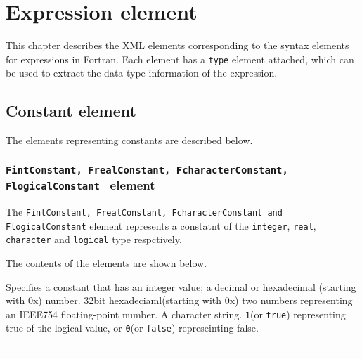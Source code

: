 \section{Expression element}

This chapter describes the XML elements corresponding to the syntax elements for expressions in Fortran.
Each element has a {\tt type} element attached, which can be used to extract the data type information of the expression.

\subsection{Constant element}

The elements representing constants are described below.

\subsubsection{ {\tt FintConstant, FrealConstant, FcharacterConstant, FlogicalConstant } element}

The {\tt FintConstant, FrealConstant, FcharacterConstant and FlogicalConstant} element represents a constatnt of the {\tt integer}, {\tt real}, {\tt character} and {\tt logical} type respctively.
\newline

The contents of the elements are shown below.
\newline

\begin{XcodeMLElementList}
{Specifies a constant that has an integer value;
 a decimal or hexadecimal (starting with 0x) number.}
{32bit hexadeciaml(starting with 0x) two numbers representing an IEEE754 floating-point number.}
{A character string.}
{{\tt 1}(or {\tt true}) representing true of the logical value, or {\tt 0}(or {\tt false}) represeinting false.}
\end{XcodeMLElementList}


\begin{XcodeMLChildElements}
\XcodeMLElementDef{-}
{-}{-}
\end{XcodeMLChildElements}

